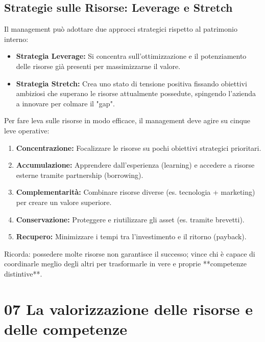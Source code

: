 \documentclass[a4paper,10pt]{article}
\begin{document}
\subsection*{Strategie sulle Risorse: Leverage e Stretch}

Il management può adottare due approcci strategici rispetto al patrimonio interno:
\begin{itemize}
    \item \textbf{Strategia Leverage:} Si concentra sull'ottimizzazione e il potenziamento delle risorse già presenti per massimizzarne il valore.
    \item \textbf{Strategia Stretch:} Crea uno stato di tensione positiva fissando obiettivi ambiziosi che superano le risorse attualmente possedute, spingendo l'azienda a innovare per colmare il "gap".
\end{itemize}

Per fare leva sulle risorse in modo efficace, il management deve agire su cinque leve operative:
\begin{enumerate}
    \item \textbf{Concentrazione:} Focalizzare le risorse su pochi obiettivi strategici prioritari.
    \item \textbf{Accumulazione:} Apprendere dall'esperienza (learning) e accedere a risorse esterne tramite partnership (borrowing).
    \item \textbf{Complementarità:} Combinare risorse diverse (es. tecnologia + marketing) per creare un valore superiore.
    \item \textbf{Conservazione:} Proteggere e riutilizzare gli asset (es. tramite brevetti).
    \item \textbf{Recupero:} Minimizzare i tempi tra l'investimento e il ritorno (payback).
\end{enumerate}

Ricorda: possedere molte risorse non garantisce il successo; vince chi è capace di coordinarle meglio degli altri per trasformarle in vere e proprie **competenze distintive**.

\section*{07 La valorizzazione delle risorse e delle competenze}
\end{document}
